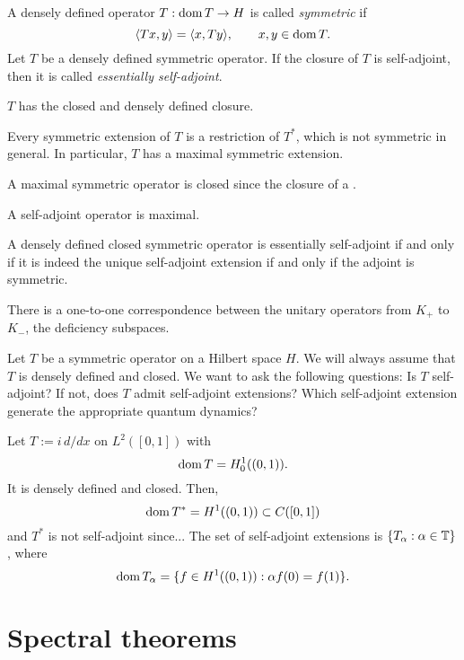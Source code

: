 \documentclass{../../large}
\begin{document}
\begin{prb}
A densely defined operator $T:\operatorname{dom} T\to H$ is called \emph{symmetric} if
\[\langle Tx,y\rangle=\langle x,Ty\rangle,\qquad x,y\in\operatorname{dom} T.\]
Let $T$ be a densely defined symmetric operator.
If the closure of $T$ is self-adjoint, then it is called \emph{essentially self-adjoint}.
\begin{parts}
\item $T$ has the closed and densely defined closure.
\item Every symmetric extension of $T$ is a restriction of $T^*$, which is not symmetric in general. In particular, $T$ has a maximal symmetric extension.
\item A maximal symmetric operator is closed since the closure of a .
\item A self-adjoint operator is maximal.
\item A densely defined closed symmetric operator is essentially self-adjoint if and only if it is indeed the unique self-adjoint extension if and only if the adjoint is symmetric.
\end{parts}
\end{prb}


\begin{prb}
There is a one-to-one correspondence between the unitary operators from $K_+$ to $K_-$, the deficiency subspaces.
\end{prb}


Let $T$ be a symmetric operator on a Hilbert space $H$.
We will always assume that $T$ is densely defined and closed.
We want to ask the following questions:
Is $T$ self-adjoint?
If not, does $T$ admit self-adjoint extensions?
Which self-adjoint extension generate the appropriate quantum dynamics?

\begin{ex*}
Let $T:=i\,d/dx$ on $L^2([0,1])$ with
\[\operatorname{dom} T=H_0^1((0,1)).\]
It is densely defined and closed.
Then,
\[\operatorname{dom} T^*=H^1((0,1))\subset C([0,1])\]
and $T^*$ is not self-adjoint since...
The set of self-adjoint extensions is $\{T_\alpha:\alpha\in\mathbb{T}\}$, where
\[\operatorname{dom} T_\alpha=\{f\in H^1((0,1)):\alpha f(0)=f(1)\}.\]
\end{ex*}



\section{Spectral theorems}
\end{document}
